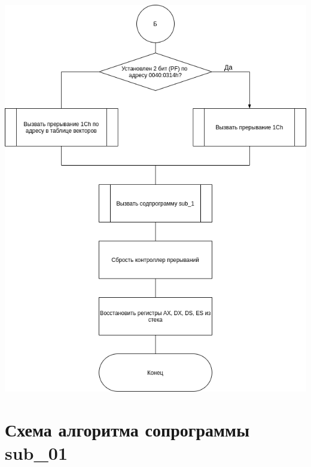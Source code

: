     \begin{center}
      \includegraphics[scale=0.6]{images/scheme-int8h_3.drawio.png}
    \end{center}
  
  \section{Схема алгоритма сопрограммы sub\_01}

